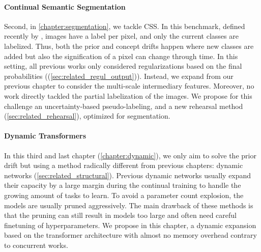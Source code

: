 \paragraph{Continual Semantic Segmentation} Second, in \autoref{chapter:segmentation}, we tackle
\acf{CSS}. In this benchmark, defined recently by \cite{cermelli2020modelingthebackground}, images
have a label per pixel, and only the current classes are labelized. Thus, both the prior and concept
drifts happen where new classes are added but also the signification of a pixel can change through
time. In this setting, all previous works only considered regularizations based on the final probabilities
((\autoref{sec:related_regul_output})). Instead, we expand from our previous chapter to consider the
multi-scale intermediary features. Moreover, no work directly tackled the partial labelization of the images.
We propose for this challenge an uncertainty-based pseudo-labeling, and a new rehearsal method (\autoref{sec:related_rehearsal}),
optimized for segmentation.

\paragraph{Dynamic Transformers} In this third and last chapter (\autoref{chapter:dynamic}), we only
aim to solve the prior drift but using a method radically different from previous chapters: dynamic
networks (\autoref{sec:related_structural}). Previous dynamic networks usually expand their capacity
by a large margin during the continual training to handle the growing amount of tasks to learn. To
avoid a parameter count explosion, the models are usually pruned aggressively. The main drawback of
these methods is that the pruning can still result in models too large and often need careful
finetuning of hyperparameters. We propose in this chapter, a dynamic expansion based on the
transformer architecture with almost no memory overhead contrary to concurrent works.
